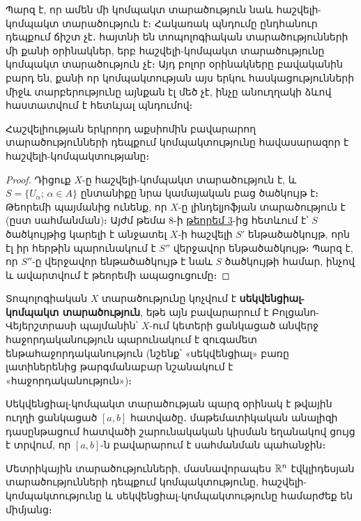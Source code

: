 \documentclass[./main.tex]{subfiles}
\begin{document}
\par Պարզ է, որ ամեն մի կոմպակտ տարածություն նաև հաշվելի-կոմպակտ տարա\-ծություն է։ Հակառակ պնդումը ընդհանուր դեպքում ճիշտ չէ․ հայտնի են տոպոլոգի\-ա\-կան տարածությունների մի քանի օրինակներ, երբ հաշվելի-կոմպակտ տարա\-ծու\-թյունը կոմպակտ տարածություն չէ։ Այդ բոլոր օրինակները բավականին բարդ են, քանի որ կոմպակտության այս երկու հասկացությունների միջև տարբերու\-թյու\-նը այնքան էլ մեծ չէ, ինչը անուղղակի ձևով հաստատվում է հետևյալ պնդումով։

\begin{theorem}\label{ch16thm11}
Հաշվելիության երկրորդ աքսիոմին բավարարող տարածություն\-նե\-րի դեպքում կոմպակտությունը հավասարազոր է հաշվելի-կոմպակտությանը։
\end{theorem}

\begin{proof}
Դիցուք $X$-ը հաշվելի-կոմպակտ տարածություն է, և $S = \{U_\alpha;\, {\alpha \in A\}}$ ընտանիքը նրա կամայական բաց ծածկույթ է։ Թեորեմի պայմանից ունենք, որ $X\textrm{-ը}$ լինդելյոֆյան տարածություն է (ըստ սահմանման)։ Այժմ թեմա 8-ի \hyperref[ch8thm3]{թեորեմ 3}-ից հետևում է՝ $S$ ծածկույթից կարելի է անջատել $X\textrm{-ի}$ հաշվելի $S'$ ենթածածկույթ, որն էլ իր հերթին պարունակում է $S''$ վերջավոր ենթածածկույթ։ Պարզ է, որ $S''$-ը վեր\-ջավոր ենթածածկույթ է նաև $S$ ծածկույթի համար, ինչով և ավարտվում է թեորեմի ապացուցումը։
\end{proof}

\begin{definition}
Տոպոլոգիական $X$ տարածությունը կոչվում է \textbf{սեկվենցիալ-կոմ\-պակտ տարածություն}, եթե այն բավարարում է Բոլցանո-Վեյերշտրասի պայմանին՝ $X$-ում կետերի ցանկացած անվերջ հաջորդականություն պարունակում է զուգամետ ենթահաջորդականություն (նշենք՝ «սեկվենցիալ» բառը լատիներենից թարգմանա\-բար նշանակում է «հաջորդականություն»)։
\end{definition}

\par Սեկվենցիալ-կոմպակտ տարածության պարզ օրինակ է թվային ուղղի ցանկա\-ցած $[a, b]$ հատվածը․ մաթեմատիկական անալիզի դասընթացում հատվածի շարու\-նա\-կական կիսման եղանակով ցույց է տրվում, որ $[a, b]$-ն բավարարում է սահման\-ման պա\-հանջին։

\begin{theorem}\label{ch16thm12}
Մետրիկային տարածությունների, մասնավորապես $\mathbb{R}^n$ էվկլի\-դես\-յան տարածությունների դեպքում կոմպակտությունը, հաշվելի-կոմպակտությունը և սեկվենցիալ-կոմպակտությունը համարժեք են միմյանց։
\end{theorem}
\end{document}
